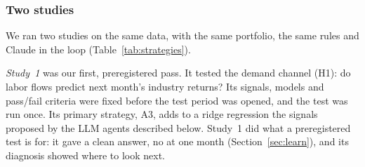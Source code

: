 \documentclass[11pt,letterpaper]{article}
\begin{document}
\subsubsection{Two studies}
We ran two studies on the same data, with the same portfolio, the same rules
and Claude in the loop (Table~\ref{tab:strategies}).

\emph{Study~1} was our first, preregistered pass. It tested the demand channel
(H1): do labor flows predict next month's industry returns? Its signals, models
and pass/fail criteria were fixed before the test period was opened, and the
test was run once. Its primary strategy, A3, adds to a ridge regression
\citep{hoerl1970} the signals proposed by the LLM agents described below. Study~1 did what a
preregistered test is for: it gave a clean answer, no at one month
(Section~\ref{sec:learn}), and its diagnosis showed where to look next.
\end{document}
